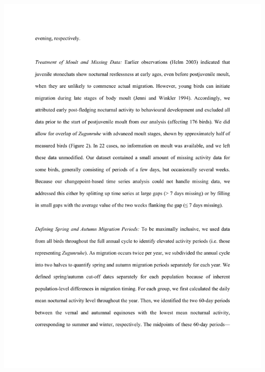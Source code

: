 \documentclass[a4paper, twoside]{templates/ociamthesis}
\begin{document}
\includegraphics[width=1\linewidth]{pdf_chapters/zug/zug_supp_crop_Part04}
\end{document}
